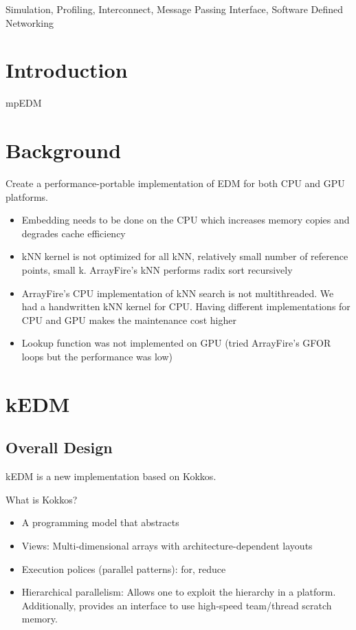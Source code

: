 \documentclass[conference]{IEEEtran}
\begin{document}
\begin{IEEEkeywords}
    Simulation, Profiling, Interconnect, Message Passing Interface, Software
    Defined Networking
\end{IEEEkeywords}

\section{Introduction}

mpEDM~\cite{Watanakeesuntorn2020}

\section{Background}

Create a performance-portable implementation of EDM for both CPU and GPU
platforms.

\begin{itemize}
\item Embedding needs to be done on the CPU which increases memory copies and degrades cache efficiency
\item kNN kernel is not optimized for all kNN, relatively small number of
    reference points, small k. ArrayFire’s kNN performs radix sort recursively
\item ArrayFire’s CPU implementation of kNN search is not multithreaded. We
    had a handwritten kNN kernel for CPU. Having different implementations for
    CPU and GPU makes the maintenance cost higher
\item Lookup function was not implemented on GPU (tried ArrayFire’s GFOR loops
    but the performance was low)
\end{itemize}

\section{kEDM}

\subsection{Overall Design}

kEDM is a new implementation based on Kokkos.

What is Kokkos?
\begin{itemize}
\item A programming model that abstracts
\item Views: Multi-dimensional arrays with architecture-dependent layouts
\item Execution polices (parallel patterns): for, reduce
\item Hierarchical parallelism: Allows one to exploit the hierarchy in a
    platform. Additionally, provides an interface to use high-speed
    team/thread scratch memory.
\end{itemize}
\end{document}

